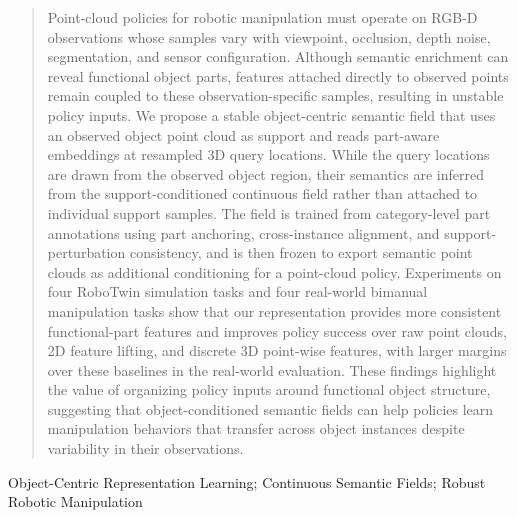 \documentclass[letterpaper, 10 pt, journal, twoside]{IEEEtran}
\begin{document}
\maketitle
\begin{abstract}
Point-cloud policies for robotic manipulation must operate on RGB-D observations whose samples vary with viewpoint, occlusion, depth noise, segmentation, and sensor configuration. Although semantic enrichment can reveal functional object parts, features attached directly to observed points remain coupled to these observation-specific samples, resulting in unstable policy inputs. We propose a stable object-centric semantic field that uses an observed object point cloud as support and reads part-aware embeddings at resampled 3D query locations. While the query locations are drawn from the observed object region, their semantics are inferred from the support-conditioned continuous field rather than attached to individual support samples. The field is trained from category-level part annotations using part anchoring, cross-instance alignment, and support-perturbation consistency, and is then frozen to export semantic point clouds as additional conditioning for a point-cloud policy. Experiments on four RoboTwin simulation tasks and four real-world bimanual manipulation tasks show that our representation provides more consistent functional-part features and improves policy success over raw point clouds, 2D feature lifting, and discrete 3D point-wise features, with larger margins over these baselines in the real-world evaluation. These findings highlight the value of organizing policy inputs around functional object structure, suggesting that object-conditioned semantic fields can help policies learn manipulation behaviors that transfer across object instances despite variability in their observations.

\end{abstract}
\begin{IEEEkeywords}
Object-Centric Representation Learning; Continuous Semantic Fields; Robust Robotic Manipulation
\end{IEEEkeywords}



%


\onecolumn
\begin{multicols}{2}


\end{multicols}
% 


\begin{multicols}{2}


\end{multicols}
\end{document}
